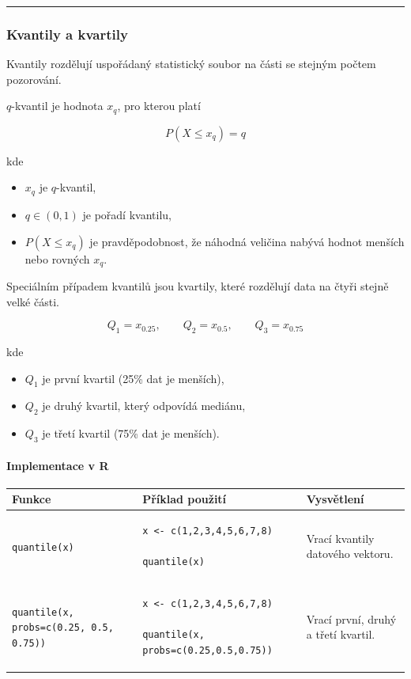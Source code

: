 \documentclass[a4paper, 11pt]{article}
\newenvironment{funkcedict}
{%
  \begingroup
  \renewcommand{\arraystretch}{1.4}%
  \lstset{basicstyle=\ttfamily\small, columns=fullflexible}%
  \setlength{\tabcolsep}{4pt}%
  \begin{tabular}{p{0.19\textwidth} p{0.38\textwidth} p{0.30\textwidth}}
  \textbf{Funkce} & \textbf{Příklad použití} & \textbf{Vysvětlení} \\
  \midrule
}
{%
  \end{tabular}%
  \endgroup
}
\begin{document}
\noindent\hrule\medskip

\subsubsection{Kvantily a kvartily}

Kvantily rozdělují uspořádaný statistický soubor na části
se stejným počtem pozorování.

$q$-kvantil je hodnota $x_q$, pro kterou platí

\begin{equation*}
	P(X \le x_q) = q
\end{equation*}

kde

\begin{itemize}[noitemsep]
	\item $x_q$ je $q$-kvantil,
	\item $q \in (0,1)$ je pořadí kvantilu,
	\item $P(X \le x_q)$ je pravděpodobnost, že náhodná veličina
	      nabývá hodnot menších nebo rovných $x_q$.
\end{itemize}

Speciálním případem kvantilů jsou kvartily, které rozdělují
data na čtyři stejně velké části.

\begin{equation*}
	Q_1 = x_{0.25}, \qquad
	Q_2 = x_{0.5}, \qquad
	Q_3 = x_{0.75}
\end{equation*}

kde

\begin{itemize}[noitemsep]
	\item $Q_1$ je první kvartil (25\% dat je menších),
	\item $Q_2$ je druhý kvartil, který odpovídá mediánu,
	\item $Q_3$ je třetí kvartil (75\% dat je menších).
\end{itemize}

\paragraph{Implementace v R}\mbox{}\par

\begin{funkcedict}

	\texttt{quantile(x)} &
	\begin{lstlisting}
x <- c(1,2,3,4,5,6,7,8)

quantile(x)
	\end{lstlisting}
	&
	Vrací kvantily datového vektoru.
	\\

	\texttt{quantile(x, probs=c(0.25, 0.5, 0.75))} &
	\begin{lstlisting}
x <- c(1,2,3,4,5,6,7,8)

quantile(x, probs=c(0.25,0.5,0.75))
	\end{lstlisting}
	&
	Vrací první, druhý a třetí kvartil.
	\\

\end{funkcedict}
\end{document}

